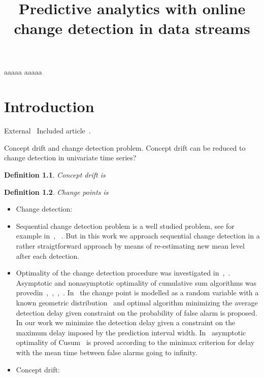 \documentclass[licentiate,utf8,lot,loar,lof,shortloft,index]{jydiss}
\title{Predictive analytics with online change detection in data streams}
\newtheorem{definition}{Definition}
\begin{document}
\preface
{} aaaaa
\acknowledgements
aaaaa
\mainmatter

\chapter{Introduction}

External~\cite{shewhart1931economic}
Included article~\cite{sha1}.

Concept drift and change detection problem.
Concept drift can be reduced to change detection in univariate time series?

\begin{definition}
  Concept drift is
\end{definition}

\begin{definition}
  Change points is
\end{definition}

\begin{itemize}
  \item Change detection:~\cite{basseville1993detection}
  
  \item Sequential change detection problem is a well studied problem, see for example in~\cite{tartakovsky2014sequential}, ~\cite{plasse2021streaming}. But in this work we approach sequential change detection in a rather straigtforward approach by means of re-estimating new mean level after each detection.
  
  \item Optimality of the change detection procedure was investigated in~\cite{Page1954},~\cite{Shiryaev2010,Shiryaev1961,Shiryaev1963}.
  Asymptotic and nonasymptotic optimality of cumulative sum algorithms was provedin~\cite{lorden1971procedures},~\cite{moustakides1986optimal},~\cite{moustakides2004optimality},~\cite{ritov1990decision}. In~\cite{Shiryaev1963,shiryaev2007optimal} the change point is modelled as a random variable with a known geometric distribution~\cite{veeravalli2014quickest} and optimal algorithm minimizing the average detection delay given constraint on the probability of false alarm is proposed. In our work we minimize the detection delay given a constraint on the maximum delay imposed by the prediction interval width. In~\cite{lorden1971procedures} asymptotic optimality of Cusum~\cite{Page1954} is proved according to the minimax criterion for delay with the mean time between false alarms going to infinity.
  
  \item Concept drift:
\end{itemize}
\end{document}
